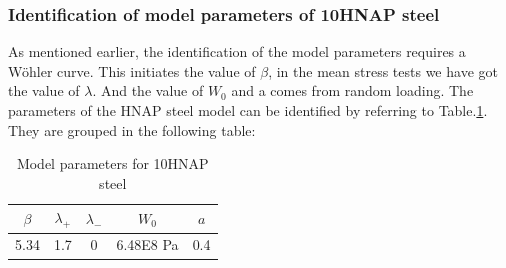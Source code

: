 \documentclass[3p,times,number,review]{elsarticle}
\begin{document}
\subsubsection{Identification of model parameters of 10HNAP steel}
As mentioned earlier, the identification of the model parameters requires a Wöhler curve. This initiates the value of $\beta$, in the mean stress tests we have got the value of $\lambda$. And the value of $W_0$ and a comes from random loading. The parameters of the HNAP steel model can be identified by referring to Table.\ref{tab.10HNAP.para}. They are grouped in the following table:
\begin{table}[!h]
\centering
\begin{tabular}{|c|c|c|c|c|}
	\hline
	\textbf{$\beta$} & \textbf{$\lambda_+$} & \textbf{$\lambda_-$} & \textbf{$W_0$} & \textbf{$a$}  \\ \hline
	5.34    & 1.7 &0         &6.48E8 Pa  & 0.4    \\ \hline
\end{tabular}
\caption{Model parameters for 10HNAP steel}
\label{tab.10HNAP.para}
\end{table}
\end{document}
